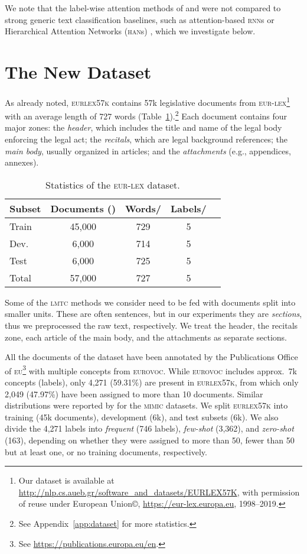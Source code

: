 \documentclass[11pt,a4paper]{article}
\newcommand{\rnn}{\textsc{rnn}\xspace}
\newcommand{\han}{\textsc{han}\xspace}
\newcommand{\lmtc}{\textsc{lmtc}\xspace}
\newcommand{\newdata}{\textsc{eurlex57k}\xspace}
\newcommand{\eurovoc}{\textsc{eurovoc}\xspace}
\newcommand{\eu}{\textsc{eu}\xspace}
\newcommand{\eurlex}{\textsc{eur-lex}\xspace}
\begin{document}
We note that the label-wise attention methods of \citet{Mullenbach2018} and \citet{Rios2018-2} were not compared to strong generic text classification baselines, such as attention-based \rnn{s} \cite{You2018} or Hierarchical Attention Networks (\han{s}) \cite{Yang2016}, which we investigate below.

\section{The New Dataset}
\label{sec:dataset}

As already noted, \newdata contains 57k legislative documents from \eurlex\footnote{Our dataset is available at \url{http://nlp.cs.aueb.gr/software_and_datasets/EURLEX57K}, with permission of reuse under European Union\copyright, \url{https://eur-lex.europa.eu}, 1998--2019.} with an average length of 727 words (Table~\ref{tab:dataset}).\footnote{See Appendix~\ref{app:dataset} for more statistics.} Each document contains four major zones: the \emph{header}, which includes the title and name of the legal body enforcing the legal act; the \emph{recitals}, which are legal background references; the \emph{main body}, usually organized in articles; and the \emph{attachments} (e.g., appendices, annexes).

\begin{table}[t]
\centering
\footnotesize
\begin{tabular}{lcccc}
  Subset & Documents () & Words/ & Labels/ \\
\hline
  Train & 45,000 & 729  & 5\\
  Dev. & 6,000 & 714  & 5 \\
  Test & 6,000 & 725  & 5\\\hline
  Total & 57,000 & 727 & 5\\
  \hline
\end{tabular}
\caption{Statistics of the \textsc{\eurlex} dataset.}
\label{tab:dataset}
\end{table}

Some of the \lmtc methods we consider need to be fed with documents split into smaller units. These are often sentences, but in our experiments they are \emph{sections}, thus we preprocessed the raw text,  respectively. We treat the header, the recitals zone, each article of the main body, and the attachments as separate sections. 

All the documents of the dataset have been annotated by the Publications Office of \eu\footnote{See \url{https://publications.europa.eu/en}.} with multiple concepts from \eurovoc. 
While \eurovoc includes approx.\ 7k concepts (labels), only 4,271 (59.31\%) are present in \newdata, from which only 2,049 (47.97\%) have been assigned to more than 10 documents. Similar distributions were reported by \citet{Rios2018-2} for the \textsc{mimic} datasets.
We split \newdata into training (45k documents), development (6k), and test subsets (6k). We also divide the 4,271 labels into \emph{frequent} (746 labels), \emph{few-shot} (3,362), and \emph{zero-shot} (163), depending on whether they were assigned to more than 50, fewer than 50 but at least one, or no training documents, respectively.
\end{document}
